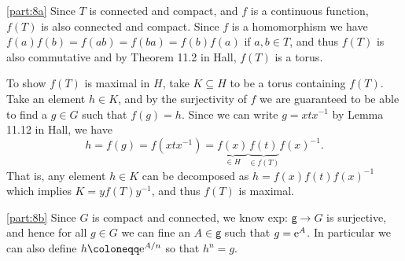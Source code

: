 \documentclass[
	pages,
	boxes,
	color=WildStrawberry
]{homework}
\begin{document}
\begin{solution}
	\ref{part:8a}
	Since $T$ is connected and compact, and $f$ is a continuous function, $f(T)$ is also connected and compact. Since $f$ is a homomorphism we have $f(a)f(b) = f(ab) = f(ba) = f(b)f(a)$ if $a, b\in T$, and thus $f(T)$ is also commutative and by Theorem 11.2 in Hall, $f(T)$ is a torus.

	To show $f(T)$ is maximal in $H$, take $K\subseteq H$ to be a torus containing $f(T)$. Take an element $h\in K$, and by the surjectivity of $f$ we are guaranteed to be able to find a $g\in G$ such that $f(g) = h$. Since we can write $g = xtx^{-1}$ by Lemma 11.12 in Hall, we have
	\begin{equation*}
		h = f(g) = f(xtx^{-1}) = \underbrace{f(x)}_{\in H}\underbrace{f(t)}_{\in f(T)}f(x)^{-1}.
	\end{equation*}
	That is, any element $h\in K$ can be decomposed as $h = f(x)f(t)f(x)^{-1}$ which implies $K = yf(T)y^{-1}$, and thus $f(T)$ is maximal.

	\ref{part:8b}
	Since $G$ is compact and connected, we know exp: $\mathsf{g}\to G$ is surjective, and hence for all $g\in G$ we can fine an $A\in\mathsf{g}$ such that $g = \mathrm{e}^{A}$. In particular we can also define $h\defeq \e^{A/n}$ so that $h^n = g$.
\end{solution}
\end{document}
